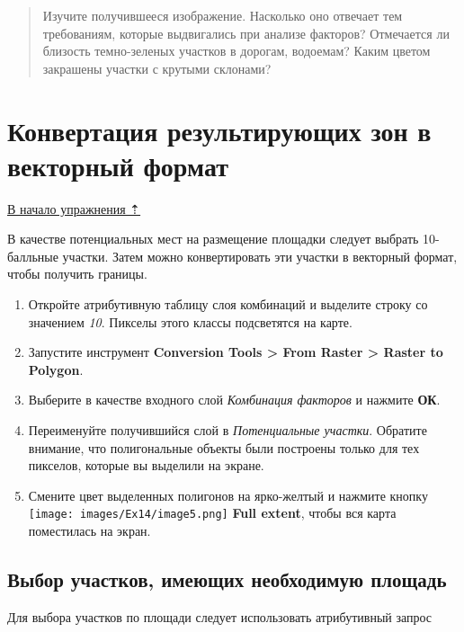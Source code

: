 \documentclass[12pt,]{book}
\begin{document}
\begin{quote}
Изучите получившееся изображение. Насколько оно отвечает тем требованиям, которые выдвигались при анализе факторов? Отмечается ли близость темно-зеленых участков в дорогам, водоемам? Каким цветом закрашены участки с крутыми склонами?
\end{quote}

\hypertarget{weighted-overlay-conversion}{%
\section{Конвертация результирующих зон в векторный формат}\label{weighted-overlay-conversion}}

\protect\hyperlink{weighted-overlay}{В начало упражнения ⇡}

В качестве потенциальных мест на размещение площадки следует выбрать 10-балльные участки. Затем можно конвертировать эти участки в векторный формат, чтобы получить границы.

\begin{enumerate}
\def\labelenumi{\arabic{enumi}.}
\item
  Откройте атрибутивную таблицу слоя комбинаций и выделите строку со значением \emph{10}. Пикселы этого классы подсветятся на карте.
\item
  Запустите инструмент \textbf{Conversion Tools \textgreater{} From Raster \textgreater{} Raster to Polygon}.
\item
  Выберите в качестве входного слой \emph{Комбинация факторов} и нажмите \textbf{ОК}.
\item
  Переименуйте получившийся слой в \emph{Потенциальные участки}. Обратите внимание, что полигональные объекты были построены только для тех пикселов, которые вы выделили на экране.
\item
  Смените цвет выделенных полигонов на ярко-желтый и нажмите кнопку \texttt{[image: images/Ex14/image5.png]} \textbf{Full extent}, чтобы вся карта поместилась на экран.
\end{enumerate}

\hypertarget{weighted-overlay-area}{%
\subsection{Выбор участков, имеющих необходимую площадь}\label{weighted-overlay-area}}

Для выбора участков по площади следует использовать атрибутивный запрос
\end{document}
